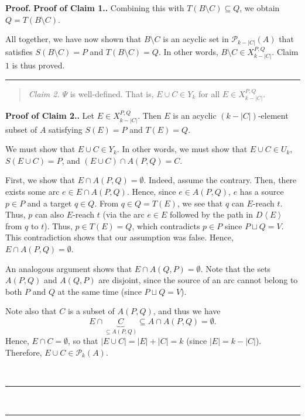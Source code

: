 \documentclass[numbers=enddot,12pt,final,onecolumn,notitlepage]{scrartcl}%
\theoremstyle{definition}
\newenvironment{statement}{\begin{quote}}{\end{quote}}
\newenvironment{proof}[1][Proof]{\noindent\textbf{#1.} }{\ \rule{0.5em}{0.5em}}
\theoremstyle{plainsl}
\begin{document}
\begin{proof}
\begin{proof}[Proof of Claim 1.]
    Combining this with $T(B\setminus C) \subseteq Q$, we obtain $Q = T(B \setminus C)$.

    All together, we have now shown that $B \setminus C$ is an acyclic set in $\mathcal{P}_{k-|C|}(A)$ that satisfies $S(B\setminus C) = P$ and $T(B\setminus C) = Q$. In other words,  $B \setminus C \in X_{k-|C|}^{P,Q}$. Claim $1$ is thus proved.
\end{proof}

\begin{statement}
\textit{Claim 2.} $\Psi$ is well-defined. That is, $E\cup C\in Y_{k}$ for all
$E\in X_{k-|C|}^{P,Q}$.
\end{statement}

\begin{proof}[Proof of Claim 2.]
    Let $E \in X_{k-|C|}^{P,Q}$. Then $E$ is an acyclic $(k-|C|)$-element subset of $A$ satisfying $S(E) = P$ and $T(E) = Q$.

    We must show that $E \cup C \in Y_{k}$. In other words, we must show that $E \cup C \in U_{k}$, $S(E \cup C) = P$, and $(E \cup C) \cap A(P,Q) = C$.

    First, we show that $E \cap A(P,Q) = \emptyset$. Indeed, assume the contrary. Then, there exists some arc $e \in E \cap A(P,Q)$. Hence, since $e \in A(P,Q)$, $e$ has a source $p \in P$ and a target $q \in Q$. From $q \in Q = T(E)$, we see that $q$ can $E$-reach $t$. Thus, $p$ can also $E$-reach $t$ (via the arc $e \in E$ followed by the path in $D \left\langle E \right\rangle$ from $q$ to $t$). Thus, $p \in T(E) = Q$, which contradicts $p \in P$ since $P \sqcup Q = V$. This contradiction shows that our assumption was false. Hence, $E \cap A(P,Q) = \emptyset$.

    An analogous argument shows that $E \cap A(Q,P) = \emptyset$. Note that the sets $A(P,Q)$ and $A(Q,P)$ are disjoint, since the source of an arc cannot belong to both $P$ and $Q$ at the same time (since $P \sqcup Q = V$).

    Note also that $C$ is a subset of $A(P,Q)$, and thus we have \begin{equation}
    \label{pf.lem.new4.c2.pf.empty}
        E \cap \underbrace{C}_{\subseteq A(P,Q)} \subseteq A \cap A(P,Q) = \emptyset.
    \end{equation} Hence, $E \cap C = \emptyset$, so that $|E \cup C| = |E|+|C| = k$ (since $|E| = k-|C|$). Therefore, $E \cup C \in \mathcal{P}_{k}(A)$.


\end{proof}
\end{proof}
\end{document}
